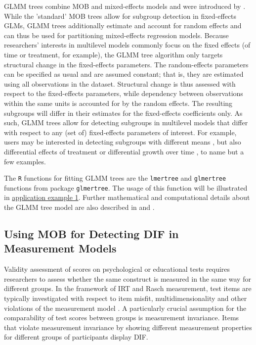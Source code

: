 \documentclass[doc,floatsintext,natbib]{apa7}
\begin{document}
GLMM trees combine MOB and mixed-effects models and were introduced by \cite{FokkySmit18}. While the 'standard' MOB trees \citep{ZeilyHoth08} allow for subgroup detection in fixed-effects GLMs, GLMM trees additionally estimate and account for random effects and can thus be used for partitioning mixed-effects regression models. Because researchers' interests in multilevel models commonly focus on the fixed effects (of time or treatment, for example), the GLMM tree algorithm only targets structural change in the fixed-effects parameters. The random-effects parameters can be specified as usual and are assumed constant; that is, they are estimated using all observations in the dataset. Structural change is thus assessed with respect to the fixed-effects parameters, while dependency between observations within the same units is accounted for by the random effects. The resulting subgroups will differ in their estimates for the fixed-effects coefficients only. As such, GLMM trees allow for detecting subgroups in multilevel models that differ with respect to any (set of) fixed-effects parameters of interest. For example, users may be interested in detecting subgroups with different means \citep{FokkyEdbr21}, but also differential effects of treatment \citep{FokkySmit18} or differential growth over time \citep{FokkyZeil23}, to name but a few examples. 

The \texttt{R} functions for fitting GLMM trees are the \texttt{lmertree} and \texttt{glmertree} functions from package \texttt{glmertree}. The usage of this function will be illustrated in \hyperref[sec:TutorialMixed]{application example 1}. Further mathematical and computational details about the GLMM tree model are also described in \cite{FokkySmit18} and \cite{FokkyZeil23}. 



\subsection{Using MOB for Detecting DIF in Measurement Models}

Validity assessment of scores on psychological or educational tests requires researchers to assess whether the same construct is measured in the same way for different groups. In the framework of IRT and Rasch measurement, test items are typically investigated with respect to item misfit, multidimensionality and other violations of the measurement model \citep[cf., for example][for an introduction]{DebStrZei:2022:CRC}. A particularly crucial assumption for the comparability of test scores between groups is measurement invariance. Items that violate measurement invariance by showing different measurement properties for different groups of participants display DIF.
\end{document}

